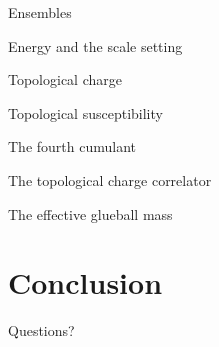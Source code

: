 \documentclass[10pt]{beamer}
\begin{document}
\begin{frame}{Ensembles}
\end{frame}

\begin{frame}{Energy and the scale setting}
\end{frame}

\begin{frame}{Topological charge}
\end{frame}

\begin{frame}{Topological susceptibility}
\end{frame}

\begin{frame}{The fourth cumulant}
\end{frame}

\begin{frame}{The topological charge correlator}
\end{frame}

\begin{frame}{The effective glueball mass}
\end{frame}

\section{Conclusion}
\begin{frame}
\end{frame}

\begin{frame}
Questions?
\end{frame}


\end{document}
